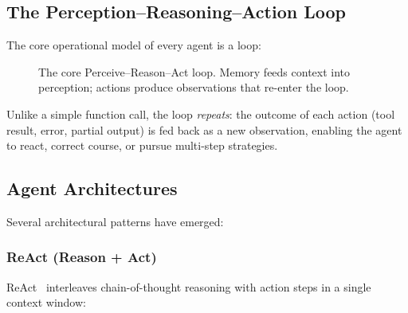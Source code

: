 \documentclass[12pt,a4paper]{article}
\begin{document}
\subsection{The Perception–Reasoning–Action Loop}

The core operational model of every agent is a loop:

\begin{figure}[h]
\centering
{}
\caption{The core Perceive--Reason--Act loop. Memory feeds context into perception;
actions produce observations that re-enter the loop.}
\label{fig:pra}
\end{figure}

Unlike a simple function call, the loop \emph{repeats}: the outcome of each action
(tool result, error, partial output) is fed back as a new observation, enabling
the agent to react, correct course, or pursue multi-step strategies.

\subsection{Agent Architectures}

Several architectural patterns have emerged:

\subsubsection{ReAct (Reason + Act)}

ReAct~\cite{yao2023react} interleaves chain-of-thought reasoning with action
steps in a single context window:
\end{document}
